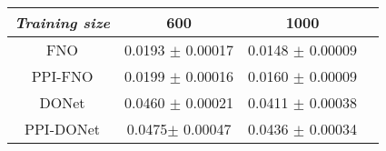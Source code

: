 \begin{table*}[h]
\begin{subtable}{\textwidth}
\begin{tabular}{cccc}
    \end{tabular}
    \end{subtable}
    \begin{subtable}{\textwidth}
    \caption{\small \textit{Eikonal}}
    \small
    \centering
        \begin{tabular}{cccc}
        \hline
        \textit{Training size}        & {600}             & {1000}             \\ \hline
        FNO                    & 0.0193 $\pm$ 0.00017	& 0.0148 $\pm$ 0.00009         \\
        PPI-FNO            & 0.0199 $\pm$ 0.00016         & 0.0160 $\pm$ 0.00009         \\
        \hline
        DONet               & 0.0460 $\pm$ 0.00021         & 0.0411 $\pm$ 0.00038        \\
        PPI-DONet               & 0.0475$\pm$ 0.00047          & 0.0436 $\pm$ 0.00034 	 \\ \hline
    \end{tabular}
    \end{subtable}


\end{table*}
